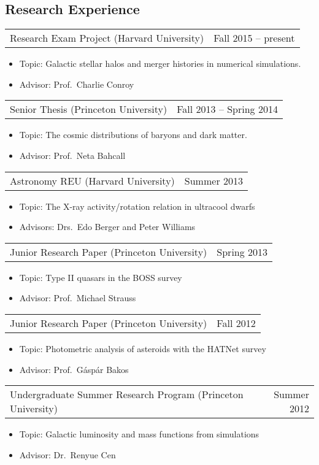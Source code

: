 \documentclass{res}
\begin{document}
\begin{resume}
\section{\textbf{Research Experience}}
\vspace{0.1in}
\begin{tabular}{@{}p{4in} r}
  Research Exam Project (Harvard University) & Fall 2015 -- present
\end{tabular}
\begin{itemize} \itemsep -2pt
  \item[] Topic: Galactic stellar halos and merger histories in
    numerical simulations.
  \item[] Advisor: Prof.~Charlie Conroy
\end{itemize}
\begin{tabular}{@{}p{4in} r}
  Senior Thesis (Princeton University) & Fall 2013 -- Spring 2014
\end{tabular}
\begin{itemize} \itemsep -2pt
\item[] Topic: The cosmic distributions of baryons and dark matter.
\item[] Advisor: Prof.~Neta Bahcall
\end{itemize}
\begin{tabular}{@{}p{4in} r}
  Astronomy REU (Harvard University) & Summer 2013
\end{tabular}
\begin{itemize} \itemsep -2pt
\item[] Topic: The X-ray activity/rotation relation in ultracool
  dwarfs
\item[] Advisors: Drs.~Edo Berger and Peter Williams
\end{itemize}
\begin{tabular}{@{}p{4in} r}
  Junior Research Paper (Princeton University) & Spring 2013
\end{tabular}
\begin{itemize} \itemsep -2pt
\item[] Topic: Type II quasars in the BOSS survey
\item[] Advisor: Prof.~Michael Strauss
\end{itemize}
\begin{tabular}{@{}p{4in} r}
  Junior Research Paper (Princeton University) & Fall 2012
\end{tabular}
\begin{itemize} \itemsep -2pt
\item[] Topic: Photometric analysis of asteroids with the HATNet
  survey
\item[] Advisor: Prof.~G\'asp\'ar Bakos
\end{itemize}
\begin{tabular}{@{}p{4in} r}
  Undergraduate Summer Research Program (Princeton University) &
  Summer 2012
\end{tabular}
\begin{itemize} \itemsep -2pt
\item[] Topic: Galactic luminosity and mass functions from simulations
\item[] Advisor: Dr.~Renyue Cen
\end{itemize}


\end{resume}
\end{document}
